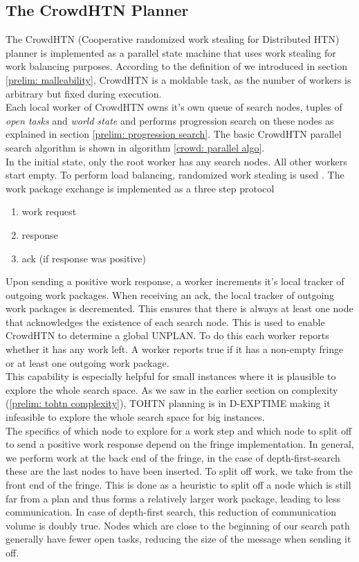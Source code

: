 \subsection{The CrowdHTN Planner}
\label{prelim: crowdhtn}
The CrowdHTN (Cooperative randomized work stealing for Distributed HTN) planner is implemented as a parallel state machine that uses work stealing for work balancing purposes. According to the definition of \cite{feitelson1997job} we introduced in section \ref{prelim: malleability}, CrowdHTN is a moldable task, as the number of workers is arbitrary but fixed during execution. \\
Each local worker of CrowdHTN owns it's own queue of search nodes, tuples of \textit{open tasks} and \textit{world state} and performs progression search on these nodes as explained in section \ref{prelim: progression search}. The basic CrowdHTN parallel search algorithm is shown in algorithm \ref{crowd: parallel algo}. \\
In the initial state, only the root worker has any search nodes. All other workers start empty. To perform load balancing, randomized work stealing is used . The work package exchange is implemented as a three step protocol
\begin{enumerate}
	\item work request
	\item response
	\item ack (if response was positive)
\end{enumerate}
Upon sending a positive work response, a worker increments it's local tracker of outgoing work packages. When receiving an ack, the local tracker of outgoing work packages is decremented. This ensures that there is always at least one node that acknowledges the existence of each search node. This is used to enable CrowdHTN to determine a global UNPLAN. To do this each worker reports whether it has any work left. A worker reports true if it has a non-empty fringe or at least one outgoing work package. \\
This capability is especially helpful for small instances where it is plausible to explore the whole search space. As we saw in the earlier section on complexity (\ref{prelim: tohtn complexity}), TOHTN planning is in D-EXPTIME making it infeasible to explore the whole search space for big instances.\\ 
The specifics of which node to explore for a work step and which node to split off to send a positive work response depend on the fringe implementation. In general, we perform work at the back end of the fringe, in the case of depth-first-search these are the last nodes to have been inserted. To split off work, we take from the front end of the fringe. This is done as a heuristic to split off a node which is still far from a plan and thus forms a relatively larger work package, leading to less communication. In case of depth-first search, this reduction of communication volume is doubly true. Nodes which are close to the beginning of our search path generally have fewer open tasks, reducing the size of the message when sending it off.
